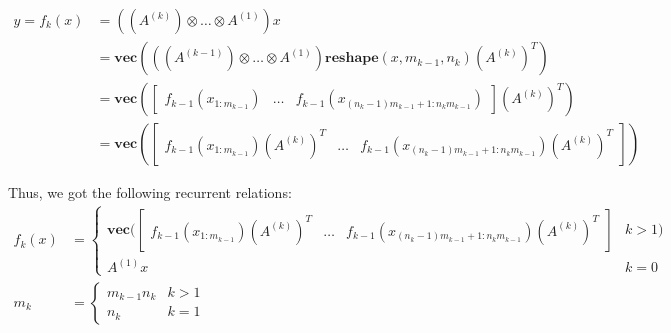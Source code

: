 \documentclass{article}
\newcommand{\vect}[1]{\textbf{vec}(#1)}
\newcommand{\reshape}{\textbf{reshape}}
\begin{document}
\begin{align*}
    y = f_k(x) & = ((A^{(k)}) \otimes \dots \otimes A^{(1)})x                                               \\
               & = \vect{((A^{(k-1)}) \otimes \dots \otimes A^{(1)}) \reshape (x,m_{k-1},n_{k})(A^{(k)})^T} \\
               & = \vect{
        \begin{bmatrix}
            f_{k-1}(x_{1:m_{k-1}}) & \dots & f_{k-1}(x_{(n_k-1)m_{k-1}+1:n_km_{k-1}})
        \end{bmatrix}
        (A^{(k)})^T
    }                                                                                                       \\
               & = \vect{
        \begin{bmatrix}
            f_{k-1}(x_{1:m_{k-1}})(A^{(k)})^T & \dots & f_{k-1}(x_{(n_k-1)m_{k-1}+1:n_km_{k-1}})(A^{(k)})^T
        \end{bmatrix}
    }
\end{align*}

Thus, we got the following recurrent relations:
\begin{align*}
    f_k(x) & =
    \begin{cases}
        \vect{
        \begin{bmatrix}
                f_{k-1}(x_{1:m_{k-1}})(A^{(k)})^T & \dots & f_{k-1}(x_{(n_k-1)m_{k-1}+1:n_km_{k-1}})(A^{(k)})^T
            \end{bmatrix} & k > 1
        }                                                                                                                                                                                                 \\
        A^{(1)}x                                                                                                                                                                                    & k=0
    \end{cases} \\
    m_k    & = \begin{cases}
                   m_{k-1}n_k & k > 1 \\
                   n_k        & k = 1
               \end{cases}
\end{align*}
\end{document}
